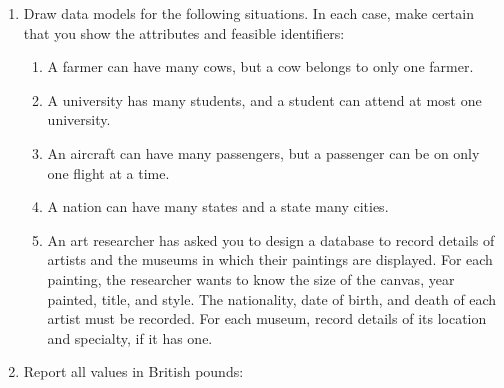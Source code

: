 \documentclass[
]{article}
\begin{document}
\begin{enumerate}
\def\labelenumi{\arabic{enumi}.}
\item
  Draw data models for the following situations. In each case, make
  certain that you show the attributes and feasible identifiers:

  \begin{enumerate}
  \def\labelenumii{\alph{enumii}.}
  \item
    A farmer can have many cows, but a cow belongs to only one
    farmer.
  \item
    A university has many students, and a student can attend at most
    one university.
  \item
    An aircraft can have many passengers, but a passenger can be on
    only one flight at a time.
  \item
    A nation can have many states and a state many cities.
  \item
    An art researcher has asked you to design a database to record
    details of artists and the museums in which their paintings are
    displayed. For each painting, the researcher wants to know the
    size of the canvas, year painted, title, and style. The
    nationality, date of birth, and death of each artist must be
    recorded. For each museum, record details of its location and
    specialty, if it has one.
  \end{enumerate}
\item
  Report all values in British pounds:


\end{enumerate}
\end{document}
